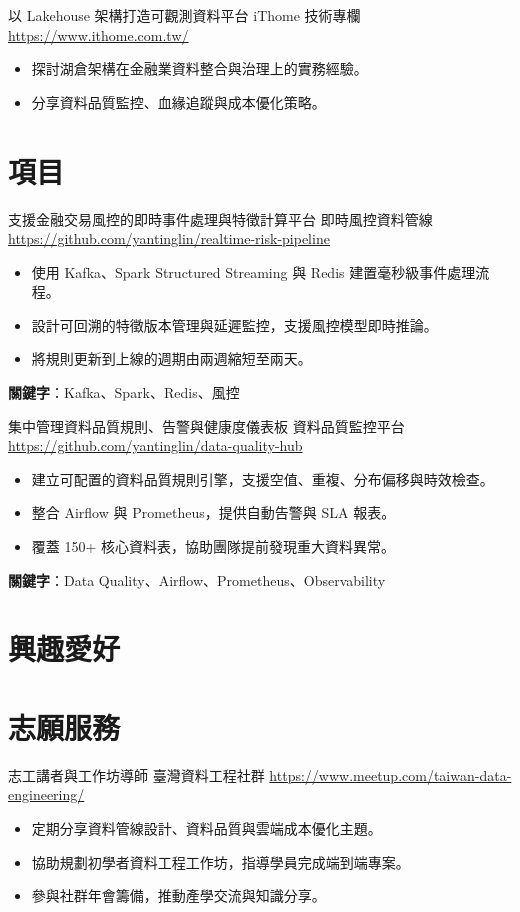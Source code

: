 \documentclass[a4paper, serif, 10pt]{moderncv}
\begin{document}
        {以 Lakehouse 架構打造可觀測資料平台}
        {iThome 技術專欄}
        {\url{https://www.ithome.com.tw/}}
        {}
        {\begin{itemize}
\item 探討湖倉架構在金融業資料整合與治理上的實務經驗。
\item 分享資料品質監控、血緣追蹤與成本優化策略。
\end{itemize}}
\section{項目}

        {支援金融交易風控的即時事件處理與特徵計算平台}
        {即時風控資料管線}
        {\url{https://github.com/yantinglin/realtime-risk-pipeline}}
        {}
        {\begin{itemize}
\item 使用 Kafka、Spark Structured Streaming 與 Redis 建置毫秒級事件處理流程。
\item 設計可回溯的特徵版本管理與延遲監控，支援風控模型即時推論。
\item 將規則更新到上線的週期由兩週縮短至兩天。
\end{itemize}
\textbf{關鍵字}：Kafka、Spark、Redis、風控}

        {集中管理資料品質規則、告警與健康度儀表板}
        {資料品質監控平台}
        {\url{https://github.com/yantinglin/data-quality-hub}}
        {}
        {\begin{itemize}
\item 建立可配置的資料品質規則引擎，支援空值、重複、分布偏移與時效檢查。
\item 整合 Airflow 與 Prometheus，提供自動告警與 SLA 報表。
\item 覆蓋 150+ 核心資料表，協助團隊提前發現重大資料異常。
\end{itemize}
\textbf{關鍵字}：Data Quality、Airflow、Prometheus、Observability}
\section{興趣愛好}

\section{志願服務}

        {志工講者與工作坊導師}
        {臺灣資料工程社群}
        {\url{https://www.meetup.com/taiwan-data-engineering/}}
        {}
        {\begin{itemize}
\item 定期分享資料管線設計、資料品質與雲端成本優化主題。
\item 協助規劃初學者資料工程工作坊，指導學員完成端到端專案。
\item 參與社群年會籌備，推動產學交流與知識分享。
\end{itemize}}
    
\end{document}
